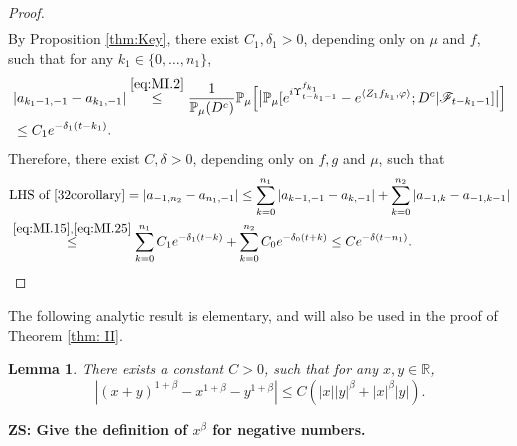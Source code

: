 \documentclass[12pt,a4paper]{amsart}
\theoremstyle{plain}
\newtheorem{lem}[thm]{Lemma}
\theoremstyle{definition}
\numberwithin{equation}{section}
\begin{document}
\begin{proof}
\begin{equation}
\begin{multlined}
\end{multlined}
\end{equation}
	By Proposition \ref{thm:Key}, there exist $C_1,\delta_1 >0$, depending only on $\mu$ and $f$, such that for any $k_1 \in \{0,\dots,n_1\}$,
\begin{align}
    &| a_{k_1-1,-1} - a_{k_1,-1}|
    \overset{\eqref{eq:MI.2}}\leq \frac{1}{\mathbb{P}_{\mu}(D^c)}\mathbb{P}_{\mu}\Big[\big|\mathbb P_\mu[e^{i\Upsilon^{f_{k_1}}_{t-k_1-1}}-e^{\langle Z_1f_{k_1}, \varphi\rangle}; D^c|\mathscr F_{t-k_1-1}]\big|\Big]
    \\&\label{eq:MI.25} \leq C_1 e^{-\delta_1 (t-k_1)}.
\end{align}
	Therefore, there exist $C,\delta >0$, depending only on $f,g$ and $\mu$, such that
\begin{align}
    &\text{LHS of \eqref{32corollary}}
    = \left|a_{-1,n_2}-a_{n_1,-1}\right|
    \leq \sum_{k=0}^{n_1}\left|a_{k-1,-1}-a_{k,-1}\right|+\sum_{k=0}^{n_2}\left|a_{-1,k}-a_{-1,k-1}\right|
    \\& \overset{\eqref{eq:MI.15},\eqref{eq:MI.25}}\leq \sum_{k=0}^{n_1} C_1 e^{-\delta_1 (t-k)}+\sum_{k=0}^{n_2} C_0 e^{-\delta_0 (t+k)}
  	\leq C e^{- \delta (t-n_1)}.
    \qedhere
\end{align}
\end{proof}

	The following analytic result is elementary, and will also be used in the proof of Theorem \ref{thm: II}.
\begin{lem} \label{ineq: analysis}
	There exists a constant $C>0$, such that for any $x,y \in \mathbb R$,
\[
    |(x+y)^{1+\beta}-x^{1+\beta}-y^{1+\beta}|
    \leq C(|x||y|^{\beta}+|x|^{\beta}|y|).
\]
\end{lem}
	{\bf ZS: Give the definition of $x^\beta$ for negative numbers.}
\begin{comment}
\begin{proof}
   	Note that
\[
  	\lim_{|y|\rightarrow \infty}\frac{(y+1)^{1+\beta}-y^{1+\beta}-1}{y^{\beta}}
  	=\lim_{|y|\rightarrow \infty}\frac{(y+1)^{1+\beta}-y^{1+\beta}}{y^{\beta}}
  	=\lim_{|y|\rightarrow \infty}\big((1+\frac{1}{y})^{1+\beta}-1\big)y = 1+\beta.
\]
	Using this and continuity, we get that there exists $C_1>0$ such that for all $|y|\geq 1$,
\[
  	|(1+y)^{1+\beta}-y^{1+\beta}-1|
  	\leq C_1 |y|^{\beta}.
\]
 	Note that if $x = 0$ or $y= 0$, then the desired result is trivial.
	So we only need to consider the case that $x \neq 0$ and $y \neq 0$.
 	In this case, if $|x|\geq |y|$, we have
\[
	|(x+y)^{1+\beta}-x^{1+\beta}-y^{1+\beta}|
	\leq |y|^{1+\beta}\bigg(\Big|\Big(1+\frac{x}{y}\Big)^{1+\beta}-\Big(\frac{x}{y}\Big)^{1+\beta}-1\Big|\bigg)
	\leq C_1|y||x|^{\beta};
\]
	and  if $|x|\leq |y|$, we have
\[
	|(x+y)^{1+\beta}-x^{1+\beta}-y^{1+\beta}|
	\leq |x|^{1+\beta}\bigg( \Big| \Big(1+\frac{y}{x}\Big)^{1+\beta}-\Big(\frac{y}{x}\Big)^{1+\beta}-1\Big|\bigg)
	\leq C_1|x||y|^{\beta}.
\]
	Combining the above, we immediately get the desired result.
\end{proof}
\end{comment}
\end{document}
